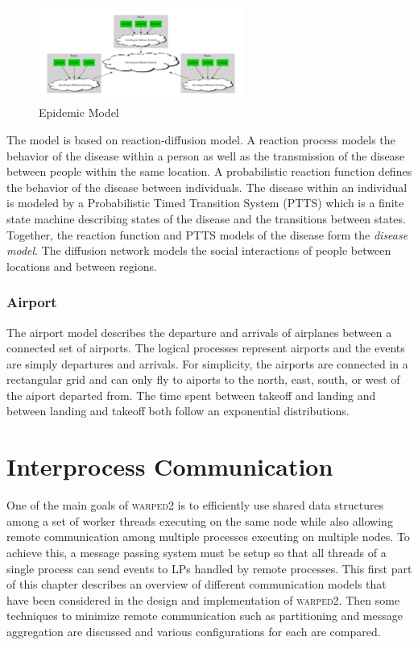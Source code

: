 \documentclass[11pt]{book}
\begin{document}
\begin{figure}
    \centering
    \includegraphics[width=0.6\textwidth,quiet]{figs/graphviz/epidemic.pdf}
    \caption{Epidemic Model}\label{epidemic_model}
\end{figure}

The model is based on reaction-diffusion model\cite{perumalla-12}.  A reaction process
models the behavior of the disease within a person as well as the transmission of the
disease between people within the same location.  A probabilistic reaction function defines
the behavior of the disease between individuals\cite{barrett-08}.  The disease within an
individual is modeled by a Probabilistic Timed Transition System (PTTS)\cite{barrett-08}
which is a finite state machine describing states of the disease and the transitions between states.
Together, the reaction function and PTTS models of the disease form the \emph{disease model}.
The diffusion network models the social interactions of people between locations and between
regions\cite{barrett-08}.

\subsection{Airport}

The airport model describes the departure and arrivals of airplanes between a connected
set of airports.  The logical processes represent airports and the events are simply
departures and arrivals.  For simplicity, the airports are connected in a rectangular grid
and can only fly to aiports to the north, east, south, or west of the aiport departed from.
The time spent between takeoff and landing and between landing and takeoff both follow an
exponential distributions.



\chapter[Communication]{Interprocess Communication} \label{partitioning_communication}

One of the main goals of \textsc{warped2} is to efficiently use shared data structures among
a set of worker threads executing on the same node while also allowing remote communication
among multiple processes executing on multiple nodes.  To achieve this, a message passing
system must be setup so that all threads of a single process can send events to LPs handled by
remote processes.  This first part of this chapter describes an overview of different communication
models that have been considered in the design and implementation of \textsc{warped2}.  Then
some techniques to minimize remote communication such as partitioning and message aggregation
are discussed and various configurations for each are compared.
\end{document}
